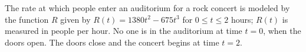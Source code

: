 
%
%
%
%
% 
% 

\question The rate at which people enter an auditorium for a rock concert is modeled by the function $R$ given by $R(t)=1380t^2-675t^3$ for $0 \leq t \leq 2$ hours; $R(t)$ is measured in people per hour. No one is in the auditorium at time $t=0$, when the doors open. The doors close and the concert begins at time $t=2$. 

\ifprintanswers
\fi 

